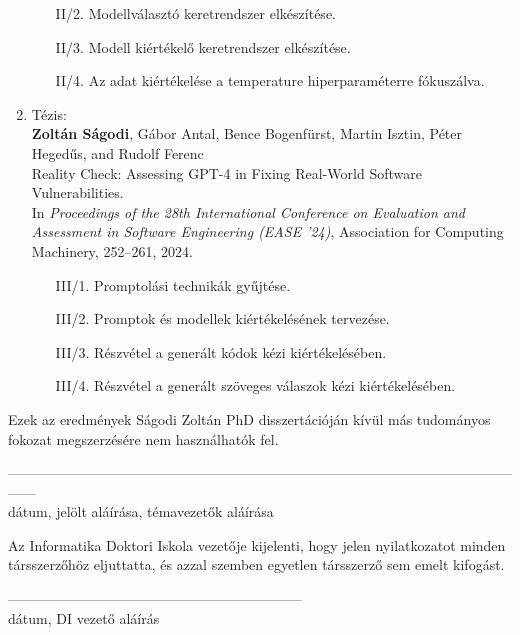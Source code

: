 \documentclass{letter}
\begin{document}
\begin{enumerate}
\begin{itemize}
			\item[II/2.] Modellválasztó keretrendszer elkészítése.
			
			\item[II/3.] Modell kiértékelő keretrendszer elkészítése.
			
			\item[II/4.] Az adat kiértékelése a temperature hiperparaméterre fókuszálva.
		\end{itemize}
\vspace{1em}
	\item Tézis:\\
		\textbf{Zoltán Ságodi}, Gábor Antal, Bence Bogenfürst, Martin Isztin, Péter Heged\H{u}s, and Rudolf Ferenc\\
		{Reality Check: Assessing GPT-4 in Fixing Real-World Software Vulnerabilities}.\\
		In \emph{Proceedings of the 28th International Conference on Evaluation and Assessment in Software Engineering (EASE '24)}, Association for Computing Machinery, 252–261, 2024.
	
		\begin{itemize}
			\item[III/1.] Promptolási technikák gyűjtése.
			
			\item[III/2.] Promptok és modellek kiértékelésének tervezése.
			
			\item[III/3.] Részvétel a generált kódok kézi kiértékelésében.
			
			\item[III/4.] Részvétel a generált szöveges válaszok kézi kiértékelésében.
		\end{itemize}
	
\end{enumerate}
\newpage
Ezek az eredmények Ságodi Zoltán PhD disszertációján kívül más tudományos fokozat
megszerzésére nem használhatók fel.
\vspace{2em}

------------------------------------------------------------------------------------------------------------------\\
dátum, jelölt aláírása, témavezetők aláírása
\vspace{0.5em}

Az Informatika Doktori Iskola vezetője kijelenti, hogy jelen nyilatkozatot minden
társszerzőhöz eljuttatta, és azzal szemben egyetlen társszerző sem emelt kifogást.
\vspace{2em}

---------------------------------------------------------------\\
dátum, DI vezető aláírás
\end{document}
